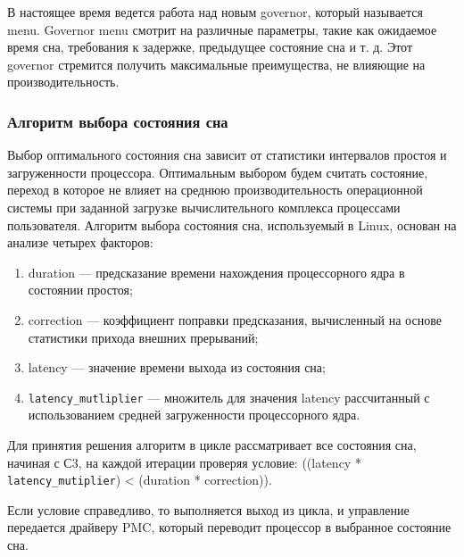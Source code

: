 \documentclass{article}
\begin{document}
В настоящее время ведется работа над новым governor, который называется menu. Governor menu смотрит на различные параметры, такие как ожидаемое время сна, требования к задержке, предыдущее состояние сна и т. д. Этот governor стремится получить максимальные преимущества, не влияющие на производительность.

\subsubsection{Алгоритм выбора состояния сна}

Выбор оптимального состояния сна зависит от статистики интервалов простоя и загруженности процессора. Оптимальным выбором будем считать состояние, переход в которое не влияет на среднюю производительность операционной системы при заданной загрузке вычислительного комплекса процессами пользователя.
Алгоритм выбора состояния сна, используемый в Linux, основан на анализе четырех
факторов:

\begin{enumerate}
\item duration --- предсказание времени нахождения процессорного ядра в состоянии простоя;
\item correction --- коэффициент поправки предсказания, вычисленный на основе статистики прихода внешних прерываний;
\item latency --- значение времени выхода из состояния сна;
\item \texttt{latency\_mutliplier} --- множитель для значения latency рассчитанный с использованием средней загруженности процессорного ядра.
\end{enumerate}


Для принятия решения алгоритм в цикле рассматривает все состояния сна, начиная с
С3, на каждой итерации проверяя условие:
((latency * \texttt{latency\_mutiplier}) < (duration * correction)).

Если условие справедливо, то выполняется выход из цикла, и управление передается
драйверу PMC, который переводит процессор в выбранное состояние сна.
\end{document}
